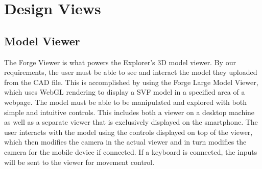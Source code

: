 \documentclass[letterpaper, 10pt, draftclsnofoot, compsoc, onecolumn]{IEEEtran}
\begin{document}
\section{Design Views}

\subsection{Model Viewer}
\label{modelView}
The Forge Viewer is what powers the Explorer's 3D model viewer. By our requirements, the user must be able to see and interact the model they uploaded from the CAD file. This is accomplished by using the Forge Large Model Viewer, which uses WebGL rendering to display a SVF model in a specified area of a webpage. The model must be able to be manipulated and explored with both simple and intuitive controls. This includes both a viewer on a desktop machine as well as a separate viewer that is exclusively displayed on the smartphone. The user interacts with the model using the controls displayed on top of the viewer, which then modifies the camera in the actual viewer and in turn modifies the camera for the mobile device if connected. If a keyboard is connected, the inputs will be sent to the viewer for movement control.
\end{document}
